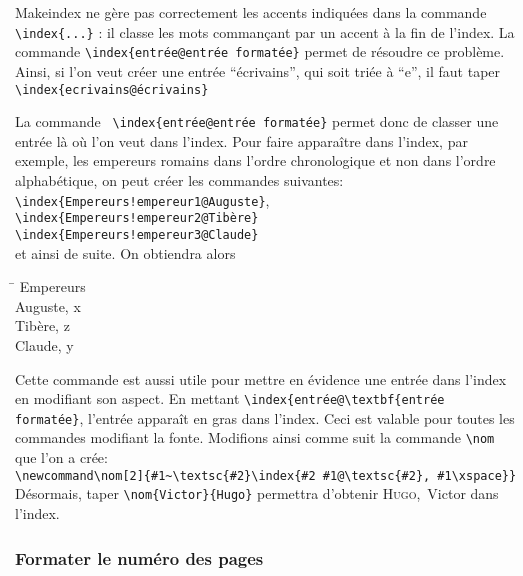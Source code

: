 Makeindex ne gère pas correctement les accents indiquées dans la commande \verb+\index{...}+ : il classe les mots commançant par un accent à la fin de l'index. La commande \verb+\index{entrée@entrée formatée}+ permet de résoudre ce problème. Ainsi, si l'on veut créer une entrée \enquote{écrivains}, qui soit triée à \enquote{e}, il faut taper \verb+\index{ecrivains@écrivains}+

La commande \verb+ \index{entrée@entrée formatée}+ permet donc de classer une entrée là où l'on veut dans l'index. Pour faire apparaître dans l'index, par exemple, les empereurs romains dans l'ordre chronologique et non dans l'ordre alphabétique, on peut créer les commandes suivantes:\\
\verb+\index{Empereurs!empereur1@Auguste}+,\\ \verb+\index{Empereurs!empereur2@Tibère}+\\
\verb+\index{Empereurs!empereur3@Claude}+\\
et ainsi de suite. On obtiendra alors
\begin{tabbing}
\hspace{0,5cm} \= \kill
Empereurs\\
\> Auguste, x\\
\> Tibère, z\\
\> Claude, y \\

\end{tabbing}

Cette commande est aussi utile pour mettre en évidence une entrée dans l'index en modifiant son aspect. En mettant \verb+\index{entrée@\textbf{entrée formatée}+, l'entrée apparaît en gras dans l'index. Ceci est valable pour toutes les commandes modifiant la fonte. Modifions ainsi comme suit la commande \verb+\nom+ que l'on a crée:\\
\verb+\newcommand\nom[2]{#1~\textsc{#2}\index{#2 #1@\textsc{#2}, #1\xspace}}+\\
Désormais, taper \verb|\nom{Victor}{Hugo}| permettra d'obtenir \textsc{Hugo},~Victor dans l'index.
 
 
 
\subsubsection{Formater le numéro des pages}


